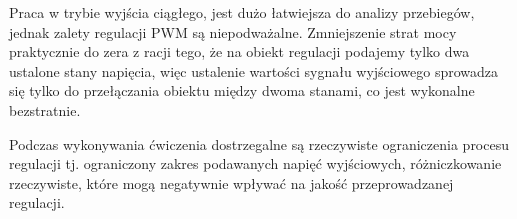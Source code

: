 \documentclass[12pt]{article}
\begin{document}
Praca w trybie wyjścia ciągłego, jest dużo łatwiejsza do analizy przebiegów,
jednak zalety regulacji PWM są niepodważalne. Zmniejszenie strat mocy
praktycznie do zera z racji tego, że na obiekt regulacji podajemy tylko dwa
ustalone stany napięcia, więc ustalenie wartości sygnału wyjściowego sprowadza
się tylko do przełączania obiektu między dwoma stanami, co jest wykonalne
bezstratnie.

Podczas wykonywania ćwiczenia dostrzegalne są rzeczywiste ograniczenia procesu
regulacji tj. ograniczony zakres podawanych napięć wyjściowych, różniczkowanie
rzeczywiste, które mogą negatywnie wpływać na jakość przeprowadzanej regulacji.
\end{document}
